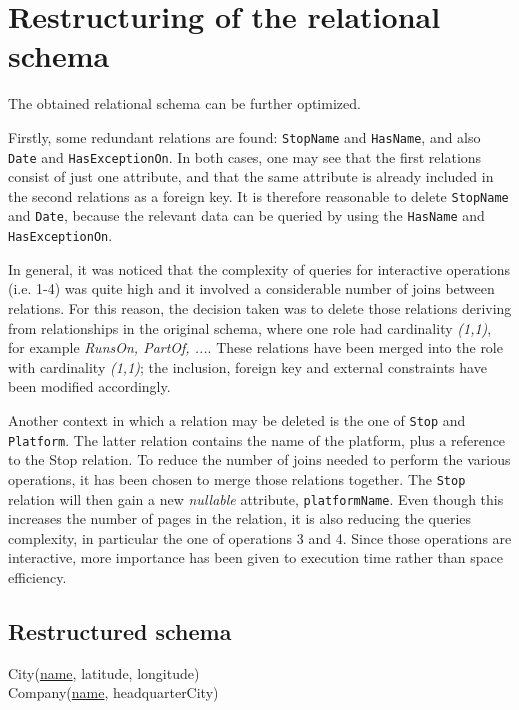 \section{Restructuring of the relational schema}

\noindent The obtained relational schema can be further optimized.

\medskip
Firstly, some redundant relations are found: \texttt{StopName} and \texttt{HasName}, and also \texttt{Date} and \texttt{HasExceptionOn}. In both cases, one may see that the first relations consist of just one attribute, and that the same attribute is already included in the second relations as a foreign key. It is therefore reasonable to delete \texttt{StopName} and \texttt{Date}, because the relevant data can be queried by using the \texttt{HasName} and \texttt{HasExceptionOn}.

\medskip
In general, it was noticed that the complexity of queries for interactive operations (i.e. 1-4) was quite high and it involved a considerable number of joins between relations. For this reason, the decision taken was to delete those relations deriving from relationships in the original schema, where one role had cardinality \textit{(1,1)}, for example \textit{RunsOn, PartOf, ...}. These relations have been merged into the role with cardinality \textit{(1,1)}; the inclusion, foreign key and external constraints have been modified accordingly.

\medskip
Another context in which a relation may be deleted is the one of \texttt{Stop} and \texttt{Platform}. The latter relation contains the name of the platform, plus a reference to the Stop relation. To reduce the number of joins needed to perform the various operations, it has been chosen to merge those relations together. The \texttt{Stop} relation will then gain a new \textit{nullable} attribute, \texttt{platformName}. Even though this increases the number of pages in the relation, it is also reducing the queries complexity, in particular the one of operations 3 and 4. Since those operations are interactive, more importance has been given to execution time rather than space efficiency.

\subsection{Restructured schema}

	City(\uline{name}, latitude, longitude) \\


	Company(\uline{name}, headquarterCity)

